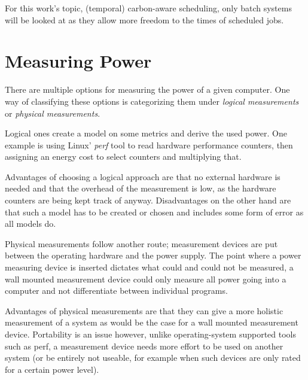 For this work's topic, (temporal) carbon-aware scheduling, only batch systems will be looked at as they allow more freedom to the times of scheduled jobs.

\section{Measuring Power}

There are multiple options for measuring the power of a given computer. One way of classifying these options is categorizing them under \emph{logical measurements} or \emph{physical measurements}.

Logical ones create a model on some metrics and derive the used power. One example is using Linux' \emph{perf} tool to read hardware performance counters, then assigning an energy cost to select counters and multiplying that. 

Advantages of choosing a logical approach are that no external hardware is needed and that the overhead of the measurement is low, as the hardware counters are being kept track of anyway. 
Disadvantages on the other hand are that such a model has to be created or chosen and includes some form of error as all models do.

Physical measurements follow another route; measurement devices are put between the operating hardware and the power supply. 
The point where a power measuring device is inserted dictates what could and could not be measured, a wall mounted measurement device could only measure all power going into a computer and not differentiate between individual programs.

Advantages of physical measurements are that they can give a more holistic measurement of a system as would be the case for a wall mounted measurement device. 
Portability is an issue however, unlike operating-system supported tools such as perf, a measurement device needs more effort to be used on another system (or be entirely not useable, for example when such devices are only rated for a certain power level).

